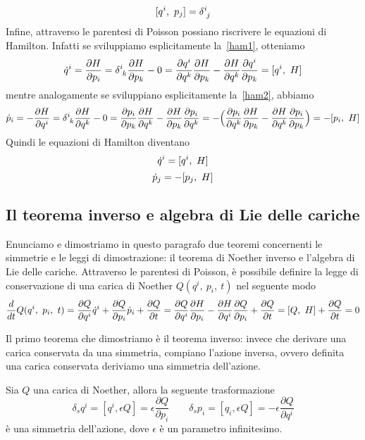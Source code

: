     \begin{equation} \label{canqq}
        \poi{q^i}{p_j} = \delta^i_{\phantom i j}
    \end{equation}
    Infine, attraverso le parentesi di Poisson possiano riscrivere le equazioni di Hamilton. Infatti se sviluppiamo esplicitamente la~\eqref{ham1}, otteniamo 
    \begin{equation*}
        \dot q^i = \pdv{H}{p_i} = \delta^i_{\phantom i k} \pdv{H}{p_k} - 0 = \pdv{q^i}{q^k} \pdv{H}{p_k} - \pdv{H}{q^k} \pdv{q^i}{p_k} = \poi{q^i}{H}
    \end{equation*}
    mentre analogamente se sviluppiano esplicitamente la~\eqref{ham2}, abbiamo
    \begin{equation*}
        \dot p_i = - \pdv{H}{q^i} = \delta^i_{\phantom i k} \pdv{H}{q^k} - 0 = \pdv{p_i}{p_k} \pdv{H}{q^k} - \pdv{H}{p_k} \pdv{p_i}{q^k} = - \Big( \pdv{p_i}{q^k} \pdv{H}{p_k} - \pdv{H}{q^k} \pdv{p_i}{p_k} \Big) = - \poi{p_i}{H}
    \end{equation*}
    Quindi le equazioni di Hamilton diventano 
    \begin{equation} \label{poiham1}
        \dot q^i = [q^i, ~H]
    \end{equation}
    \begin{equation} \label{poiham2}
        \dot p_j = - [p_j, ~H]
    \end{equation}  

\subsection{Il teorema inverso e algebra di Lie delle cariche}

    Enunciamo e dimostriamo in questo paragrafo due teoremi concernenti le simmetrie e le leggi di dimostrazione: il teorema di Noether inverso e l'algebra di Lie delle cariche. Attraverso le parentesi di Poisson, è possibile definire la legge di conservazione di una carica di Noether $ Q(q^i, ~p_i, ~t)$ nel seguente modo
    \begin{equation} \label{caricaham}
        \frac{d}{dt} Q(q^i, ~p_i, ~t) = \frac{\partial Q}{\partial q^i} \dot q^i + \frac{\partial Q}{\partial p_i} \dot p_i + \frac{\partial Q}{\partial t} = \frac{\partial Q}{\partial q^i} \frac{\partial H}{\partial p_i} - \frac{\partial H}{\partial q^i} \frac{\partial Q}{\partial p_i} + \frac{\partial Q}{\partial t} = [Q, ~H] + \frac{\partial Q}{\partial t} = 0
    \end{equation}

    Il primo teorema che dimostriamo è il teorema inverso: invece che derivare una carica conservata da una simmetria, compiano l'azione inversa, ovvero definita una carica conservata deriviamo una simmetria dell'azione.
    \begin{theorem}
        Sia $Q$ una carica di Noether, allora la seguente trasformazione 
    \begin{equation}
        \delta_s q^i = [q^i, \epsilon Q] = \epsilon \frac{\partial Q}{\partial p_i} \qquad \delta_s p_i = [q_i, \epsilon Q] = - \epsilon \frac{\partial Q}{\partial q^i}
    \end{equation}
        è una simmetria dell'azione, dove $\epsilon$ è un parametro infinitesimo.
    \end{theorem}

